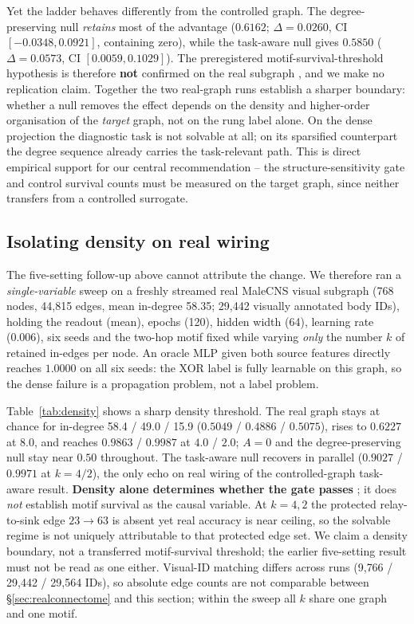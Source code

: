 \documentclass[10pt,twocolumn,letterpaper]{article}
\begin{document}
Yet the ladder behaves differently from the controlled graph. The
degree-preserving null \emph{retains} most of the advantage ($0.6162$;
$\Delta=0.0260$, CI $[-0.0348,0.0921]$, containing zero), while the
task-aware null gives $0.5850$ ($\Delta=0.0573$, CI
$[0.0059,0.1029]$). The preregistered motif-survival-threshold hypothesis is
therefore \textbf{not} confirmed on the real subgraph
, and we make no replication claim.
Together the two real-graph runs establish a sharper boundary: whether a null
removes the effect depends on the density and higher-order organisation of the
\emph{target} graph, not on the rung label alone. On the dense projection the
diagnostic task is not solvable at all; on its sparsified counterpart the
degree sequence already carries the task-relevant path. This is direct
empirical support for our central recommendation -- the structure-sensitivity
gate and control survival counts must be measured on the target graph, since
neither transfers from a controlled surrogate.

\subsection{Isolating density on real wiring}
\label{sec:density}

The five-setting follow-up above cannot attribute the change. We therefore ran
a \emph{single-variable} sweep on a freshly streamed real MaleCNS visual
subgraph (768 nodes, 44{,}815 edges, mean in-degree 58.35; 29{,}442 visually
annotated body IDs), holding the readout (mean), epochs (120), hidden width
(64), learning rate (0.006), six seeds and the two-hop motif fixed while
varying \emph{only} the number $k$ of retained in-edges per node. An oracle MLP
given both source features directly reaches $1.0000$ on all six seeds: the XOR
label is fully learnable on this graph, so the dense failure is a propagation
problem, not a label problem.

Table~\ref{tab:density} shows a sharp density threshold. The real graph stays
at chance for in-degree 58.4 / 49.0 / 15.9 ($0.5049$ / $0.4886$ / $0.5075$),
rises to $0.6227$ at $8.0$, and reaches $0.9863$ / $0.9987$ at $4.0$ / $2.0$;
$A\!=\!0$ and the degree-preserving null stay near $0.50$ throughout. The
task-aware null recovers in parallel ($0.9027$ / $0.9971$ at $k\!=\!4/2$), the
only echo on real wiring of the controlled-graph task-aware result.
\textbf{Density alone determines whether the gate passes}
; it does \emph{not} establish motif survival
as the causal variable. At $k\!=\!4,2$ the protected relay-to-sink edge
$23\!\to\!63$ is absent yet real accuracy is near ceiling, so the solvable
regime is not uniquely attributable to that protected edge set. We claim a
density boundary, not a transferred motif-survival threshold; the earlier
five-setting result must not be read as one either. Visual-ID matching differs
across runs (9{,}766 / 29{,}442 / 29{,}564 IDs), so absolute edge counts are not
comparable between \S\ref{sec:realconnectome} and this section; within the
sweep all $k$ share one graph and one motif.
\end{document}
